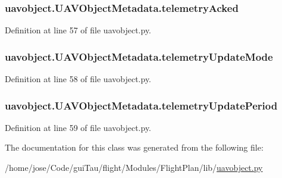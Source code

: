 \hypertarget{classuavobject_1_1_u_a_v_object_metadata_a6db603de03ffee19a9d87a5fcb3e061a}{
\subsubsection[{telemetry\-Acked}]{\setlength{\rightskip}{0pt plus 5cm}uavobject.\-U\-A\-V\-Object\-Metadata.\-telemetry\-Acked}}\label{classuavobject_1_1_u_a_v_object_metadata_a6db603de03ffee19a9d87a5fcb3e061a}


Definition at line 57 of file uavobject.\-py.

\hypertarget{classuavobject_1_1_u_a_v_object_metadata_a69cc9ce6fccdbdddc4d84594fc1f9b17}{
\subsubsection[{telemetry\-Update\-Mode}]{\setlength{\rightskip}{0pt plus 5cm}uavobject.\-U\-A\-V\-Object\-Metadata.\-telemetry\-Update\-Mode}}\label{classuavobject_1_1_u_a_v_object_metadata_a69cc9ce6fccdbdddc4d84594fc1f9b17}


Definition at line 58 of file uavobject.\-py.

\hypertarget{classuavobject_1_1_u_a_v_object_metadata_a83392d1f62434b4421bb27a5557b7436}{
\subsubsection[{telemetry\-Update\-Period}]{\setlength{\rightskip}{0pt plus 5cm}uavobject.\-U\-A\-V\-Object\-Metadata.\-telemetry\-Update\-Period}}\label{classuavobject_1_1_u_a_v_object_metadata_a83392d1f62434b4421bb27a5557b7436}


Definition at line 59 of file uavobject.\-py.



The documentation for this class was generated from the following file\-:\begin{DoxyCompactItemize}
\item 
/home/jose/\-Code/gui\-Tau/flight/\-Modules/\-Flight\-Plan/lib/\hyperlink{uavobject_8py}{uavobject.\-py}\end{DoxyCompactItemize}
